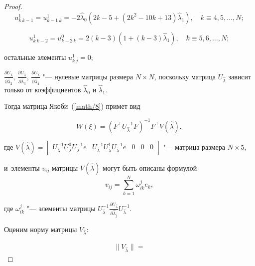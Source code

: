 \begin{proof}
$$u^{1}_{k~k-1}=u^{1}_{k-1~k}=-2\hat{\lambda}_0( 2k-5+( 2k^2-10k+13 ) \hat{\lambda}_1 ),\quad  k\equiv 4, 5, \ldots, N;$$

$$u^{1}_{k~k-2}=u^{0}_{k-2~k}=2( k-3 ) ( 1+( k-3 ) \hat{\lambda}_1 ) , \quad k\equiv 5, 6, \ldots, N;$$

остальные элементы  $u^{1}_{k~j}=0$;

 $\frac{\partial U_{\hat{\lambda}}}{\partial\hat{\lambda}_2}$, $\frac{\partial U_{\hat{\lambda}}}{\partial\hat{\lambda}_3}$, $\frac{\partial U_{\hat{\lambda}}}{\partial\hat{\lambda}_4}$ "--- нулевые матрицы размера $N{\times} N$,  поскольку матрица  $U_{\hat{\lambda}}$ зависит только от коэффициентов  $\hat{\lambda}_0$ и   $\hat{\lambda}_1$.



    Тогда матрица Якоби~(\ref{math/8}) примет вид

    \begin{equation}

        \label{math/9}

        W( \xi ) =( F^{\top}U^{-1}_{\hat{\lambda}}F ) ^{-1}F^{\top}V( \hat{\lambda} ) , 

    \end{equation}

    где   $V( \hat{\lambda} ) =\left[

                        \begin{array}{ccccc}

                            U^{-1}_{\hat{\lambda}}U^{0}_{\hat{\lambda}}U^{-1}_{\hat{\lambda}}e & U^{-1}_{\hat{\lambda}}U^{1}_{\hat{\lambda}}U^{-1}_{\hat{\lambda}}e & 0 & 0 & 0

                        \end{array}

                    \right]$ "--- матрица размера $N{\times} 5$, 

и~элементы $v_{ij}$  матрицы $V( \hat{\lambda} ) $  могут быть описаны формулой $$v_{ij}=\sum_{k=1}^{N}\omega^{j}_{ik}e_k ,$$ 

    где  $\omega^{j}_{ik}$ "---  элементы матрицы $U^{-1}_{\hat{\lambda}}\frac{\partial U_{\hat{\lambda}}}{\partial\hat{\lambda}_j}U^{-1}_{\hat{\lambda}}$.



Оценим норму матрицы  $V_{\hat{\lambda}}$:

\begin{multline*}

\bigl\|V_{\hat{\lambda}}\bigr\|=


\end{multline*}
\end{proof}
